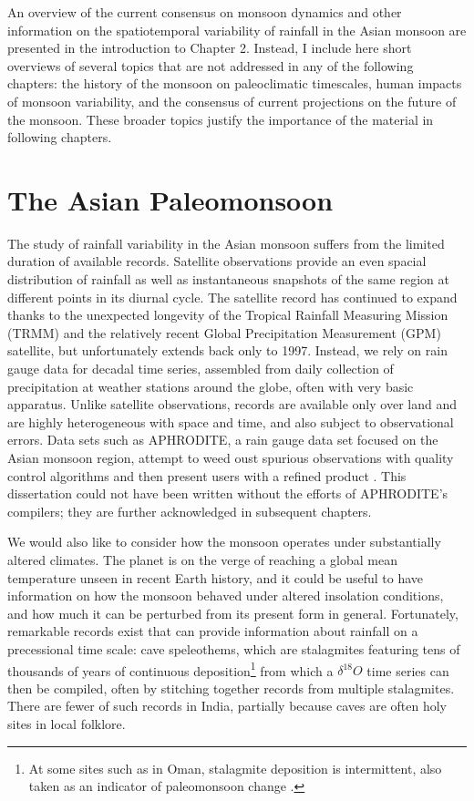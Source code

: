 	An overview of the current consensus on monsoon dynamics and other information on the spatiotemporal variability of rainfall in the Asian monsoon are presented in the introduction to Chapter 2. Instead, I include here short overviews of several topics that are not addressed in any of the following chapters: the history of the monsoon on paleoclimatic timescales, human impacts of monsoon variability, and the consensus of current projections on the future of the monsoon. These broader topics justify the importance of the material in following chapters.
	
\section{The Asian Paleomonsoon}

	The study of rainfall variability in the Asian monsoon suffers from the limited duration of available records. Satellite observations provide an even spacial distribution of rainfall as well as instantaneous snapshots of the same region at different points in its diurnal cycle. The satellite record has continued to expand thanks to the unexpected longevity of the Tropical Rainfall Measuring Mission (TRMM) and the relatively recent Global Precipitation Measurement (GPM) satellite, but unfortunately extends back only to 1997. Instead, we rely on rain gauge data for decadal time series, assembled from daily collection of precipitation at weather stations around the globe, often with very basic apparatus. Unlike satellite observations, records are available only over land and are highly heterogeneous with space and time, and also subject to observational errors. Data sets such as APHRODITE, a rain gauge data set focused on the Asian monsoon region, attempt to weed oust spurious observations with quality control algorithms and then present users with a refined product \citep{Yatagai2012}. This dissertation could not have been written without the efforts of APHRODITE's compilers; they are further acknowledged in subsequent chapters.
	
	We would also like to consider how the monsoon operates under substantially altered climates. The planet is on the verge of reaching a global mean temperature unseen in recent Earth history, and it could be useful to have information on how the monsoon behaved under altered insolation conditions, and how much it can be perturbed from its present form in general. Fortunately, remarkable records exist that can provide information about rainfall on a precessional time scale: cave speleothems, which are stalagmites featuring tens of thousands of years of continuous deposition\footnote{At some sites such as in Oman, stalagmite deposition is intermittent, also taken as an indicator of paleomonsoon change \citep{Burns2001,Fleitmann2003}.} from which a $\delta ^{18}O$ time series can then be compiled, often by stitching together records from multiple stalagmites. There are fewer of such records in India, partially because caves are often holy sites in local folklore.
	
